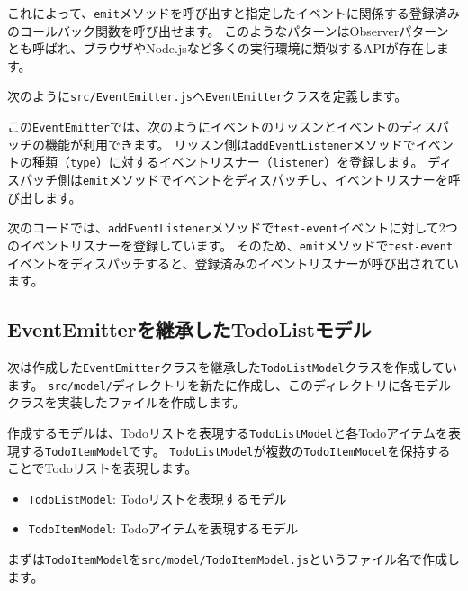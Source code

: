 これによって、\texttt{emit}メソッドを呼び出すと指定したイベントに関係する登録済みのコールバック関数を呼び出せます。
このようなパターンはObserverパターンとも呼ばれ、ブラウザやNode.jsなど多くの実行環境に類似するAPIが存在します。

次のように\texttt{src/EventEmitter.js}へ\texttt{EventEmitter}クラスを定義します。



この\texttt{EventEmitter}では、次のようにイベントのリッスンとイベントのディスパッチの機能が利用できます。
リッスン側は\texttt{addEventListener}メソッドでイベントの種類（\texttt{type}）に対するイベントリスナー（\texttt{listener}）を登録します。
ディスパッチ側は\texttt{emit}メソッドでイベントをディスパッチし、イベントリスナーを呼び出します。

次のコードでは、\texttt{addEventListener}メソッドで\texttt{test-event}イベントに対して2つのイベントリスナーを登録しています。
そのため、\texttt{emit}メソッドで\texttt{test-event}イベントをディスパッチすると、登録済みのイベントリスナーが呼び出されています。



\hypertarget{event-emitter-todolist-model}{%
\subsection{EventEmitterを継承したTodoListモデル}\label{event-emitter-todolist-model}}

次は作成した\texttt{EventEmitter}クラスを継承した\texttt{TodoListModel}クラスを作成しています。
\texttt{src/model/}ディレクトリを新たに作成し、このディレクトリに各モデルクラスを実装したファイルを作成します。

作成するモデルは、Todoリストを表現する\texttt{TodoListModel}と各Todoアイテムを表現する\texttt{TodoItemModel}です。
\texttt{TodoListModel}が複数の\texttt{TodoItemModel}を保持することでTodoリストを表現します。

\begin{itemize}
\item
  \texttt{TodoListModel}: Todoリストを表現するモデル
\item
  \texttt{TodoItemModel}: Todoアイテムを表現するモデル
\end{itemize}

まずは\texttt{TodoItemModel}を\texttt{src/model/TodoItemModel.js}というファイル名で作成します。

